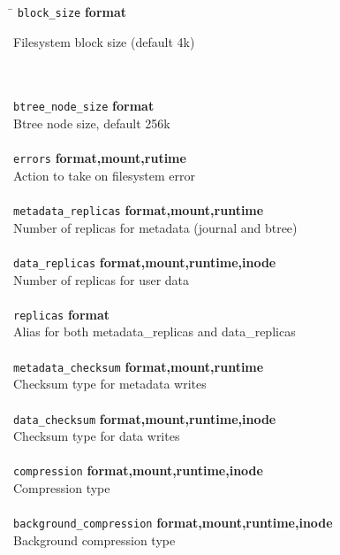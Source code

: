 \documentclass{article}
\begin{document}
\begin{tabbing}
\hspace{0.2in} \= \kill
	\texttt{block\_size}		\` \textbf{format}			\\
	\> \parbox{4.3in}{Filesystem block size (default 4k)}			\\ \\

	\texttt{btree\_node\_size}	\` \textbf{format}			\\
	\> Btree node size, default 256k					\\ \\

	\texttt{errors}			\` \textbf{format,mount,rutime}		\\
	\> Action to take on filesystem error					\\ \\

	\texttt{metadata\_replicas}	\` \textbf{format,mount,runtime}	\\
	\> Number of replicas for metadata (journal and btree)			\\ \\

	\texttt{data\_replicas}		\` \textbf{format,mount,runtime,inode}	\\
	\> Number of replicas for user data					\\ \\

	\texttt{replicas}		\` \textbf{format}			\\
	\> Alias for both metadata\_replicas and data\_replicas			\\ \\

	\texttt{metadata\_checksum}	\` \textbf{format,mount,runtime}	\\
	\> Checksum type for metadata writes					\\ \\

	\texttt{data\_checksum}		\` \textbf{format,mount,runtime,inode}	\\
	\> Checksum type for data writes					\\ \\

	\texttt{compression}		\` \textbf{format,mount,runtime,inode}	\\
	\> Compression type							\\ \\

	\texttt{background\_compression} \` \textbf{format,mount,runtime,inode}	\\
	\> Background compression type						\\ \\


\end{tabbing}
\end{document}
